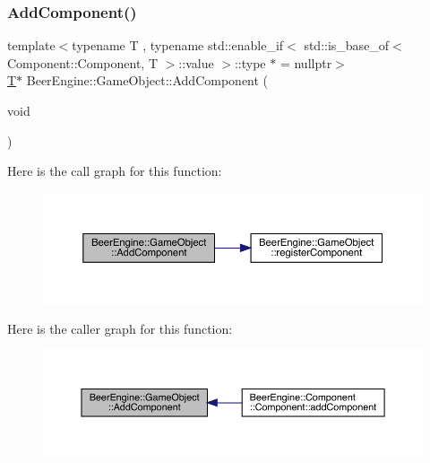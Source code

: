 \subsubsection{\texorpdfstring{Add\+Component()}{AddComponent()}}
{\footnotesize\ttfamily template$<$typename T , typename std\+::enable\+\_\+if$<$ std\+::is\+\_\+base\+\_\+of$<$ Component\+::\+Component, T $>$\+::value $>$\+::type $\ast$  = nullptr$>$ \\
\mbox{\hyperlink{namespace_beer_engine_a94f0b552f6dc910de8cdb44207981f53a8de48e594408f9fc561b2f68ce05f664}{T}}$\ast$ Beer\+Engine\+::\+Game\+Object\+::\+Add\+Component (\begin{DoxyParamCaption}\item[{void}]{ }\end{DoxyParamCaption})\hspace{0.3cm}{\ttfamily [inline]}}

Here is the call graph for this function\+:\nopagebreak
\begin{figure}[H]
\begin{center}
\leavevmode
\includegraphics[width=350pt]{class_beer_engine_1_1_game_object_a62e1af180bc3c2cd12c06153ac06aa3a_cgraph}
\end{center}
\end{figure}
Here is the caller graph for this function\+:\nopagebreak
\begin{figure}[H]
\begin{center}
\leavevmode
\includegraphics[width=350pt]{class_beer_engine_1_1_game_object_a62e1af180bc3c2cd12c06153ac06aa3a_icgraph}
\end{center}
\end{figure}
\mbox{\label{class_beer_engine_1_1_game_object_a50b9ea3bbd7fa155f5ab4b4b1da52b7a}} 
